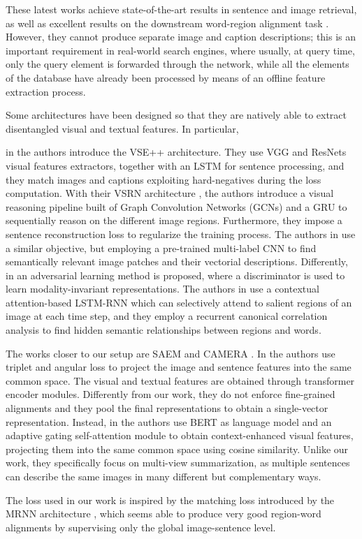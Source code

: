 \documentclass[acmsmall]{acmart}
\newcommand{\majorrevised}[1]{#1}
\begin{document}
{{These latest works achieve state-of-the-art results in sentence and image retrieval, as well as excellent results on the downstream word-region alignment task \cite{chen2019uniter}. However, they cannot produce separate image and caption descriptions; this is an important requirement in real-world search engines, where usually, at query time, only the query element is forwarded through the network, while all the elements of the database have already been processed by means of an offline feature extraction process.}




Some architectures have been designed so that they are natively able to extract disentangled visual and textual features. In particular, } in \cite{vsepp2018faghri} the authors introduce the VSE++ architecture. They use VGG and ResNets visual features extractors, together with an LSTM for sentence processing, and they match images and captions exploiting hard-negatives during the loss computation. 
With their VSRN architecture \cite{li2019}, the authors introduce a visual reasoning pipeline built of Graph Convolution Networks (GCNs) and a GRU to sequentially reason on the different image regions. Furthermore, they impose a sentence reconstruction loss to regularize the training process. 
\majorrevised{The authors in \cite{huang2018image} use a similar objective, but employing a pre-trained multi-label CNN to find semantically relevant image patches and their vectorial descriptions.
Differently, in \cite{sarafianos2019adversarial} an adversarial learning method is proposed, where a discriminator is used to learn modality-invariant representations. The authors in \cite{guo2020associating} use a contextual attention-based LSTM-RNN which can selectively attend to salient regions of an image at each time step, and they employ a recurrent canonical correlation analysis to find hidden semantic relationships between regions and words.

The works closer to our setup are SAEM \cite{wu2019learning} and CAMERA \cite{qu2020context}. In \cite{wu2019learning} the authors use triplet and angular loss to project the image and sentence features into the same common space. The visual and textual features are obtained through transformer encoder modules. Differently from our work, they do not enforce fine-grained alignments and they pool the final representations to obtain a single-vector representation. Instead, in \cite{qu2020context} the authors use BERT as language model and an adaptive gating self-attention module to obtain context-enhanced visual features, projecting them into the same common space using cosine similarity. Unlike our work, they specifically focus on multi-view summarization, as multiple sentences can describe the same images in many different but complementary ways.





The loss used in our work is inspired by the matching loss introduced by the MRNN architecture \cite{karpathy2015alignment}, which seems able to produce very good region-word alignments by supervising only the global image-sentence level.
}
\end{document}
